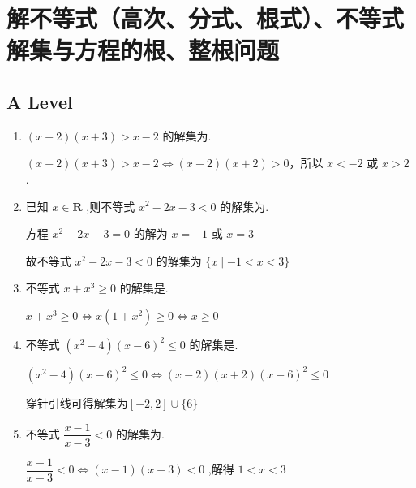 \section*{解不等式（高次、分式、根式）、不等式解集与方程的根、整根问题}
\subsection*{A Level}
\begin{enumerate}
    \item $\left( {x - 2}\right) \left( {x + 3}\right)  > x - 2$ 的解集为.
    \begin{jieda}
        $\left( {x - 2}\right) \left( {x + 3}\right)  > x - 2 \Longleftrightarrow\left( {x - 2}\right) \left( {x + 2}\right)  > 0$，所以 $x <  - 2$ 或 $x > 2$ .
    \end{jieda}
    \item 已知 $x \in  \mathbf{R}$ ,则不等式 ${x}^{2} - {2x} - 3 < 0$ 的解集为.
    \begin{jieda}
        方程 ${x}^{2} - {2x} - 3 = 0$ 的解为 $x =  - 1$ 或 $x = 3$

        故不等式 ${x}^{2} - {2x} - 3 < 0$ 的解集为 $\{ x \mid   - 1 < x < 3\}$
    \end{jieda}
    \item 不等式 $x + {x}^{3} \geq  0$ 的解集是.
    \begin{jieda}
        $x + {x}^{3} \geq  0 \Longleftrightarrow x\left( {1 + {x}^{2}}\right)  \geq  0 \Longleftrightarrow x \geq 0$
    \end{jieda}
    \item 不等式 $\left( {{x}^{2} - 4}\right) {\left( x - 6\right) }^{2} \leq  0$ 的解集是.
    \begin{jieda}
        $\left( {{x}^{2} - 4}\right) {\left( x - 6\right) }^{2} \leq  0 \Longleftrightarrow \left( {x - 2}\right) \left( {x + 2}\right) {\left( x - 6\right)  }^{2} \leq  0$

        穿针引线可得解集为$[-2, 2] \cup \{6\}$
    \end{jieda}
    \item 不等式 $\dfrac{x - 1}{x - 3} < 0$ 的解集为.
    \begin{jieda}
        $\dfrac{x - 1}{x - 3} < 0 \Longleftrightarrow \left( {x - 1}\right) \left( {x - 3}\right)  < 0$ ,解得 $1 < x < 3$
    \end{jieda}
    

\end{enumerate}
